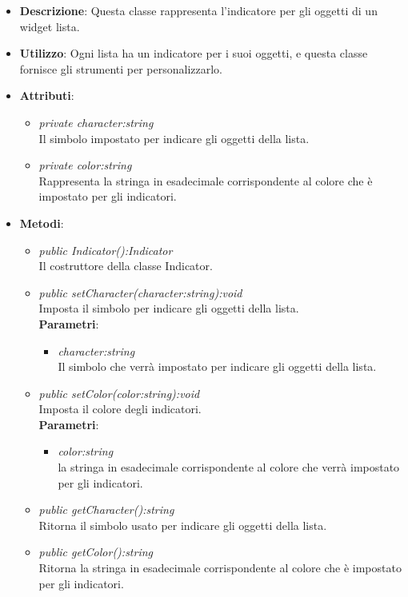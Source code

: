 \begin{itemize}
\item \textbf{Descrizione}: Questa classe rappresenta l'indicatore per gli oggetti di un widget lista.
\item \textbf{Utilizzo}: Ogni lista ha un indicatore per i suoi oggetti, e questa classe fornisce gli strumenti per personalizzarlo.
\item \textbf{Attributi}:
	\begin{itemize}
	\item \textit{private character:string}\\
	Il simbolo impostato per indicare gli oggetti della lista.
	\item \textit{private color:string}\\
	Rappresenta la stringa in esadecimale corrispondente al colore che è impostato per gli indicatori.
	\end{itemize}
\item \textbf{Metodi}:
	\begin{itemize}
	\item \textit{public Indicator():Indicator}\\
	Il costruttore della classe Indicator.
	\item \textit{public setCharacter(character:string):void}\\
	Imposta il simbolo per indicare gli oggetti della lista.
		\\ \textbf{Parametri}: \begin{itemize}
		\item \textit{character:string}\\
		Il simbolo che verrà impostato per indicare gli oggetti della lista.
		\end{itemize} 
	\item \textit{public setColor(color:string):void}\\
	Imposta il colore degli indicatori.
		\\ \textbf{Parametri}: \begin{itemize}
		\item \textit{color:string}\\
		la stringa in esadecimale corrispondente al colore che verrà impostato per gli indicatori.
		\end{itemize} 
	\item \textit{public getCharacter():string}\\
	Ritorna il simbolo usato per indicare gli oggetti della lista.
	\item \textit{public getColor():string}\\
	Ritorna la stringa in esadecimale corrispondente al colore che è impostato per gli indicatori.
	\end{itemize}
\end{itemize}

